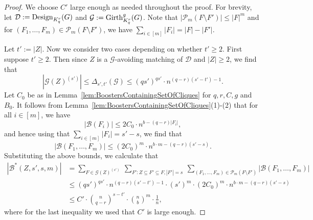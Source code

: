 \documentclass[11pt]{article}
\newcommand{\mc}[1]{\mathcal{#1}}
\newcounter{i}
\theoremstyle{plain}
\theoremstyle{plain} %
\theoremstyle{definition}
\begin{document}
\begin{proof}
We choose $C'$ large enough as needed throughout the proof. For brevity, let $\mc{D}:={\rm Design}_{K_q^r}(G)$ and $\mc{G}:= {\rm Girth}_{K_q^r}^g(G)$. Note that $|\mc{P}_{m}(F\setminus F')|\le |F|^{m}$ and for $(F_1,\ldots, F_m)\in \mc{P}_{m}(F\setminus F')$, we have $\sum_{i\in [m]} |F_i| = |F|-|F'|$. 

Let $t':= |Z|$. Now we consider two cases depending on whether $t'\ge 2$. First suppose $t'\ge 2$. Then since $Z$ is a $\mc{G}$-avoiding matching of $\mc{D}$ and $|Z|\ge 2$, we find that
$$|\mc{G}(Z)^{(s')}| \le \Delta_{s',t'}(\mc{G}) \le (qs')^{qs'}\cdot n^{(q-r)(s'-t') - 1}.$$ 
Let $C_0$ be as in Lemma~\ref{lem:BoostersContainingSetOfCliques} for $q,r,C,g$ and $B_0$. It follows from Lemma~\ref{lem:BoostersContainingSetOfCliques}(1)-(2) that for all $i\in [m]$, we have
$$|\mc{B}(F_i)|\le 2C_0\cdot n^{b-(q-r)|F_i|},$$
and hence using that $\sum_{i\in [m]} |F_i| = s'-s$, we find that
$$|\mc{B}(F_1,\ldots, F_{m})| \le (2C_0)^{m}\cdot n^{b\cdot m-(q-r)(s'-s)}.$$ 
Substituting the above bounds, we calculate that
\begin{align*}
|\mc{B}^{*}(Z,s',s,m)| &= \sum_{F\in \mc{G}(Z)^{(s')}}~\sum_{F': Z\subseteq F' \subseteq F, |F'|=s}~\sum_{(F_1,\ldots, F_{m})\in \mc{P}_{m}(F\setminus F')} |\mc{B}(F_1,\ldots, F_{m})| \\
&\le (qs')^{qs'}\cdot  n^{(q-r)(s'-t') - 1} \cdot (s')^{m}\cdot  (2C_0)^{m}\cdot n^{b\cdot m-(q-r)(s'-s)} \\  
&\le C'\cdot \binom{n}{q-r}^{s-t'}\cdot \binom{n}{b}^{m}\cdot \frac{1}{n},
\end{align*}
where for the last inequality we used that $C'$ is large enough.  


\end{proof}
\end{document}
